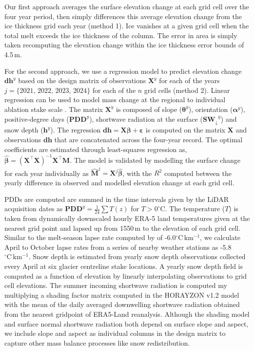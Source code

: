 \documentclass[annals,review,oneside]{igs}
\begin{document}
Our first approach averages the surface elevation change at each grid cell over the four year period, then simply differences this average elevation change from the ice thickness grid each year (method 1). Ice vanishes at a given grid cell when the total melt exceeds the ice thickness of the column. The error in area is simply taken recomputing the elevation change within the ice thickness error bounds of 4.5\,m. 

For the second approach, we use a regression model to predict elevation change $\mathbf{dh}^{y}$ based on the design matrix of observations $\mathbf{X}^{y}$ for each of the years $j=\{2021,\,2022,\,2023,\,2024\}$ for each of the $n$ grid cells (method 2). Linear regression can be used to model mass change at the regional \citep{Lliboutry1974,Anilkumar2023,Reynaud1986} to individual ablation stake scale \citep{Zekollari2018}. The matrix $\mathbf{X}^{y}$ is composed of slope ($\boldsymbol{\theta}^{y}$), orientation ($\boldsymbol{\alpha}^{y}$), positive-degree days ($\mathbf{PDD}^{y}$), shortwave radiation at the surface ($\mathbf{SW_{\downarrow}}^{y}$) and snow depth ($\mathbf{h}^{y}$). The regression $\mathbf{dh} = \mathbf{X} \boldsymbol{\beta} + \boldsymbol{\varepsilon}$ is computed on the matrix $\mathbf{X}$ and observations $\mathbf{dh}$ that are concatenated across the four-year record. The optimal coefficients are estimated through least-squares regression as, $\hat{\boldsymbol{\beta}} = (\mathbf{X}^\top \mathbf{X})^{-1} \mathbf{X}^\top \mathbf{M}$. The model is validated by modelling the surface change for each year individually as $\hat{\mathbf{M}}^{j} = \mathbf{X}^{j} \hat{\boldsymbol{\beta}}$, with the $R^2$ computed between the yearly difference in observed and modelled elevation change at each grid cell. 

PDDs are computed are summed in the time intervals given by the LiDAR acquisition dates as $\mathbf{PDD}^y = \frac{1}{24}\sum T(z)$ for $T>0^{\circ}$C. The temperature ($T$) is taken from dynamically downscaled hourly ERA-5 land temperatures \citep{Hersbach2020} given at the nearest grid point and lapsed up from 1550\,m to the elevation of each grid cell. Similar to the melt-season lapse rate computed by \cite{Shea2009} of -6.0$\mathrm{^{\circ}C\,km^{-1}}$, we calculate April to October lapse rates from a series of nearby weather stations as -5.8$\mathrm{^{\circ}C\,km^{-1}}$. Snow depth is estimated from yearly snow depth observations collected every April at six glacier centreline stake locations. A yearly snow depth field is computed as a function of elevation by linearly interpolating observations to grid cell elevations. The summer incoming shortwave radiation is computed my multiplying a shading factor matrix computed in the HORAYZON v1.2 model \citep{Steger2022} with the mean of the daily averaged downwelling shortwave radiation obtained from the nearest gridpoint of ERA5-Land reanalysis. Although the shading model and surface normal shortwave radiation both depend on surface slope and aspect, we include slope and aspect as individual columns in the design matrix to capture other mass balance processes like snow redistribution.
\end{document}
